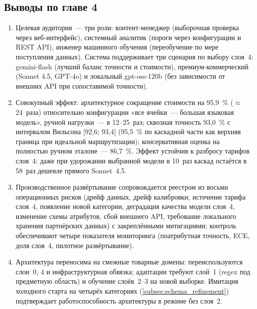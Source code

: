\subsection{Выводы по главе 4}

\begin{enumerate}[label=\arabic*)]
    \item Целевая аудитория~--- три роли: контент-менеджер (выборочная проверка через веб-интерфейс), системный аналитик (пороги через конфигурации и REST API), инженер машинного обучения (переобучение по мере поступления данных). Система поддерживает три сценария по выбору слоя~4: gemini-flash (лучший баланс точности и стоимости), премиум-коммерческий (Sonnet 4.5, GPT-4o) и локальный gpt-oss-120b (без зависимости от внешних API при сопоставимой точности).
    \item Совокупный эффект: архитектурное сокращение стоимости на 95,9~\% ($\approx$24~раза) относительно конфигурации «все ячейки~--- большая языковая модель», ручной нагрузки~--- в 12--25~раз; сквозная точность 93,0~\% с интервалом Вильсона [92,6; 93,4] (95,5~\% по каскадной части как верхняя граница при идеальной маршрутизации); консервативная оценка на полностью ручном эталоне~--- 86,7~\%. Эффект устойчив к разбросу тарифов слоя~4: даже при удорожании выбранной модели в 10~раз каскад остаётся в 58~раз дешевле прямого Sonnet~4.5.
    \item Производственное развёртывание сопровождается реестром из восьми операционных рисков (дрейф данных, дрейф калибровки, истечение тарифа слоя~4, появление новой категории, деградация качества модели слоя~4, изменение схемы атрибутов, сбой внешнего API, требование локального хранения партнёрских данных) с закреплёнными митигациями; контроль обеспечивают четыре показателя мониторинга (поатрибутная точность, ECE, доля слоя~4, пилотное развёртывание).
    \item Архитектура переносима на смежные товарные домены: переиспользуются слои~0, 4 и инфраструктурная обвязка; адаптации требуют слой~1 (regex под предметную область) и обучение слоёв~2--3 на новой выборке. Имитация холодного старта на четырёх категориях (\ref{subsec:schema_refinement}) подтверждает работоспособность архитектуры в режиме без слоя~2.
\end{enumerate}

